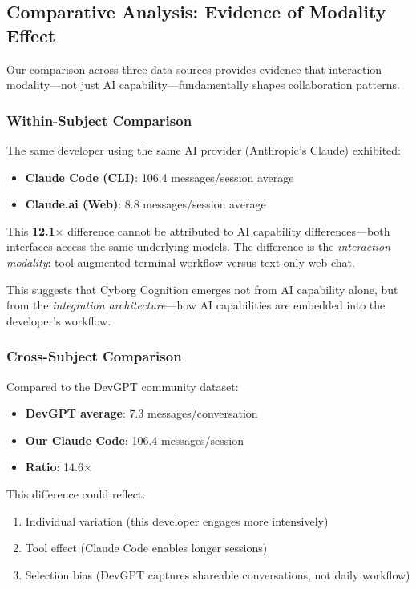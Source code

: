 \subsection{Comparative Analysis: Evidence of Modality Effect}

Our comparison across three data sources provides evidence that interaction modality---not just AI capability---fundamentally shapes collaboration patterns.

\subsubsection{Within-Subject Comparison}

The same developer using the same AI provider (Anthropic's Claude) exhibited:
\begin{itemize}
    \item \textbf{Claude Code (CLI)}: 106.4 messages/session average
    \item \textbf{Claude.ai (Web)}: 8.8 messages/session average
\end{itemize}

This \textbf{12.1$\times$} difference cannot be attributed to AI capability differences---both interfaces access the same underlying models. The difference is the \textit{interaction modality}: tool-augmented terminal workflow versus text-only web chat.

This suggests that Cyborg Cognition emerges not from AI capability alone, but from the \textit{integration architecture}---how AI capabilities are embedded into the developer's workflow.

\subsubsection{Cross-Subject Comparison}

Compared to the DevGPT community dataset:
\begin{itemize}
    \item \textbf{DevGPT average}: 7.3 messages/conversation
    \item \textbf{Our Claude Code}: 106.4 messages/session
    \item \textbf{Ratio}: 14.6$\times$
\end{itemize}

This difference could reflect:
\begin{enumerate}
    \item Individual variation (this developer engages more intensively)
    \item Tool effect (Claude Code enables longer sessions)
    \item Selection bias (DevGPT captures shareable conversations, not daily workflow)
\end{enumerate}

